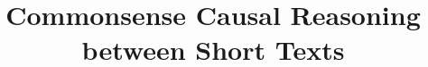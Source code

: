 \documentclass[letterpaper]{article}
\begin{document}
\title{Commonsense Causal Reasoning between Short Texts}

\maketitle
\begin{abstract}

\end{abstract}









\end{document}
